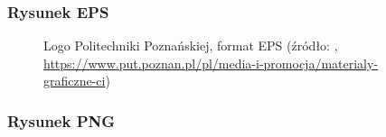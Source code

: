 \subsubsection{Rysunek EPS}

 \begin{figure}[ht]
  \centering
  \caption{Logo Politechniki Poznańskiej, format EPS (źródło: \cite{noauthor_materialy_nodate}, \protect\url{https://www.put.poznan.pl/pl/media-i-promocja/materialy-graficzne-ci})}
  \label{fig:logoPP-EPS}
\end{figure}


\subsubsection{Rysunek PNG}

